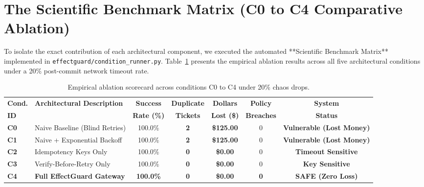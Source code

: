 \section{The Scientific Benchmark Matrix (C0 to C4 Comparative Ablation)}
\label{sec:res_matrix}
To isolate the exact contribution of each architectural component, we executed the automated **Scientific Benchmark Matrix** implemented in \texttt{effectguard/condition\_runner.py}. Table~\ref{tab:matrix_ablation} presents the empirical ablation results across all five architectural conditions under a 20\% post-commit network timeout rate.

\begin{table}[H]
\centering
\small
\renewcommand{\arraystretch}{1.25}
\begin{tabularx}{\textwidth}{lp{4.2cm}ccccc}
\toprule
\textbf{Cond.} & \textbf{Architectural Description} & \textbf{Success} & \textbf{Duplicate} & \textbf{Dollars} & \textbf{Policy} & \textbf{System} \\
\textbf{ID} & & \textbf{Rate (\%)} & \textbf{Tickets} & \textbf{Lost (\$)} & \textbf{Breaches} & \textbf{Status} \\
\midrule
\textbf{C0} & Naive Baseline (Blind Retries) & 100.0\% & \textbf{2} & \textbf{\$125.00} & 0 & \textcolor{red!80!black}{\textbf{Vulnerable (Lost Money)}} \\
\textbf{C1} & Naive + Exponential Backoff & 100.0\% & \textbf{2} & \textbf{\$125.00} & 0 & \textcolor{red!80!black}{\textbf{Vulnerable (Lost Money)}} \\
\textbf{C2} & Idempotency Keys Only & 100.0\% & \textbf{0} & \textbf{\$0.00} & 0 & \textcolor{orange!80!black}{\textbf{Timeout Sensitive}} \\
\textbf{C3} & Verify-Before-Retry Only & 100.0\% & \textbf{0} & \textbf{\$0.00} & 0 & \textcolor{orange!80!black}{\textbf{Key Sensitive}} \\
\textbf{C4} & \textbf{Full EffectGuard Gateway} & \textbf{100.0\%} & \textbf{0} & \textbf{\$0.00} & \textbf{0} & \textcolor{green!60!black}{\textbf{SAFE (Zero Loss)}} \\
\bottomrule
\end{tabularx}
\caption{Empirical ablation scorecard across conditions C0 to C4 under 20\% chaos drops.}
\label{tab:matrix_ablation}
\end{table}

